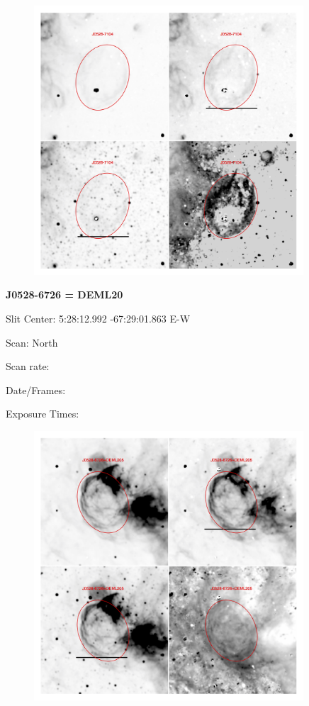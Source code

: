\documentclass[11pt]{article}
\begin{document}
\begin{figure}
\includegraphics[width=10.05cm]{snapshots/J0528-7104_big.png}
\end{figure}

\newpage
{\bf J0528-6726 = DEML20}  
 
Slit Center:   5:28:12.992  -67:29:01.863  E-W

Scan:  North

Scan rate:  

Date/Frames:

Exposure Times:  

\begin{figure}
\includegraphics[width=10.05cm]{snapshots/J0528-6726.png}
\end{figure}
\end{document}
